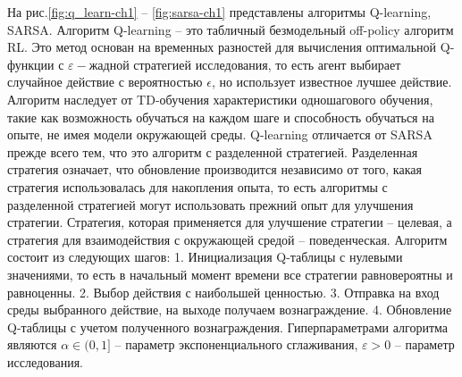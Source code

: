 На рис.\ref{fig:q_learn-ch1} -- \ref{fig:sarsa-ch1} представлены алгоритмы Q-learning, SARSA. Алгоритм Q-learning -- это табличный безмодельный off-policy алгоритм RL. Это метод основан на временных разностей для вычисления оптимальной Q-функции с $\varepsilon-$жадной стратегией исследования, то есть агент выбирает случайное действие с вероятностью $\epsilon$, но использует известное лучшее действие. Алгоритм наследует от TD-обучения характеристики одношагового обучения, такие как возможность обучаться на каждом шаге и способность обучаться на опыте, не имея модели окружающей среды.
Q-learning отличается от SARSA прежде всего тем, что это алгоритм с разделенной стратегией. Разделенная стратегия означает, что обновление производится независимо от того, какая стратегия использовалась для накопления опыта, то есть алгоритмы с разделенной стратегией
могут использовать прежний опыт для улучшения стратегии. Стратегия, которая применяется для улучшение стратегии -- целевая, а стратегия для взаимодействия с окружающей средой -- поведенческая.
Алгоритм состоит из следующих шагов: 1. Инициализация Q-таблицы с нулевыми значениями, то есть в начальный момент времени все стратегии равновероятны и равноценны. 2. Выбор действия с наибольшей ценностью. 3. Отправка на вход среды выбранного действие, на выходе получаем вознаграждение. 4. Обновление Q-таблицы с учетом полученного вознаграждения.
Гиперпараметрами алгоритма являются $\alpha \in (0,1] $ -- параметр экспоненциального сглаживания, $\varepsilon > 0 $ -- параметр исследования.

